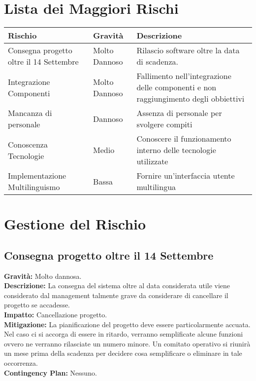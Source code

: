 \documentclass[a4paper,12pt]{article}
\begin{document}
\pagebreak

\section{Lista dei Maggiori Rischi}
\begin{table}[h]
\begin{center}
\begin{tabular}{ p{4.5cm} p{3cm} p{5cm} } 
\rowcolor{Ash}	
\hline	
Rischio & Gravità & Descrizione  \\ \hline
Consegna progetto oltre il 14 Settembre & Molto Dannoso & Rilascio software oltre la data di scadenza. \\ 
Integrazione Componenti & Molto Dannoso & Fallimento nell'integrazione delle componenti e non raggiungimento degli obbiettivi  \\ 
Mancanza di personale & Dannoso & Assenza di personale per svolgere compiti \\ 
Conoscenza Tecnologie & Medio & Conoscere il funzionamento interno delle tecnologie utilizzate \\ 
Implementazione Multilinguismo & Bassa & Fornire un'interfaccia utente multilingua  \\ \hline
\end{tabular}
\end{center}
\end{table}

\section{Gestione del Rischio}
\subsection{Consegna progetto oltre il 14 Settembre}
\textbf{Gravità:} Molto dannosa.\\
\textbf{Descrizione:} La consegna del sistema oltre al data considerata utile viene considerato dal management talmente grave da considerare di cancellare il progetto se accadesse.\\
\textbf{Impatto:} Cancellazione progetto.\\
\textbf{Mitigazione:} La pianificazione del progetto deve essere particolarmente accuata. Nel caso ci si accorga di essere in ritardo, verranno semplificate alcune funzioni ovvero ne verranno rilasciate un numero minore. Un comitato operativo si riunirà un mese prima della scadenza per decidere cosa semplificare o eliminare in tale occorrenza.\\
\textbf{Contingency Plan:} Nessuno.
\end{document}
